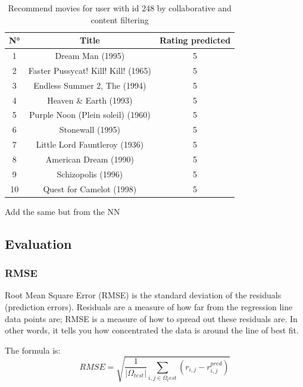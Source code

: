 \documentclass{article}
\begin{document}
\begin{table}[h]
    \centering
    \begin{tabular}{c|c|c}
        \hline
    \rowcolor{lightgray}N° & Title & Rating predicted\\ 
        \hline
        1 & Dream Man (1995) & 5\\
        \hline
        2 & Faster Pussycat! Kill! Kill! (1965) & 5\\
        \hline
        3 & Endless Summer 2, The (1994) & 5\\
        \hline
        4 & Heaven \& Earth (1993) & 5\\
        \hline
        5 & Purple Noon (Plein soleil) (1960) & 5\\
        \hline
        6 & Stonewall (1995) & 5\\
        \hline
        7 & Little Lord Fauntleroy (1936) & 5\\
        \hline
        8 & American Dream (1990) & 5\\
        \hline
        9 & Schizopolis (1996) & 5\\
        \hline
        10 & Quest for Camelot (1998) & 5\\
        \hline
    \end{tabular}
    \caption{Recommend movies for user with id 248 by collaborative and content filtering}
    \label{tab:recommendedMovie1}
\end{table}

Add the same but from the NN

\subsection{Evaluation}

\subsubsection{RMSE}

Root Mean Square Error (RMSE) is the standard deviation of the residuals (prediction errors). Residuals are a measure of how far from the regression line data points are; RMSE is a measure of how to spread out these residuals are. In other words, it tells you how concentrated the data is around the line of best fit. 

The formula is:
\begin{equation}
      RMSE = \sqrt{\frac{1}{|\Omega_{test}|}\sum_{i,j\in\Omega_test} (r_{i,j} - r_{i,j}^{pred})}
\end{equation}
\end{document}
